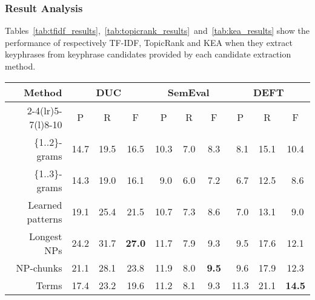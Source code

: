     \subsubsection{Result Analysis}
    \label{subsubsec:candidate_extraction_result_analysis}
      Tables~\ref{tab:tfidf_results},~\ref{tab:topicrank_results}~and~\ref{tab:kea_results}
      show the performance of respectively TF-IDF, TopicRank and KEA when
      they extract keyphrases from keyphrase candidates provided by each
      candidate extraction method.
      \begin{table*}
        \centering
        \begin{tabular}{@{~}rccccccccc@{~}}
          \toprule
          \multirow{2}{*}[-2pt]{\textbf{Method}} & \multicolumn{3}{c}{\textbf{DUC}} & \multicolumn{3}{c}{\textbf{SemEval}} & \multicolumn{3}{c}{\textbf{DEFT}}\\
          \cmidrule(r){2-4}\cmidrule(lr){5-7}\cmidrule(l){8-10}
          & P & R & F & P & R & F & P & R & F\\
          \midrule
          \{1..2\}-grams & 14.7 & 19.5 & 16.5 & 10.3 & $~~$7.0 & $~~$8.3 & $~~$8.1 & 15.1 & 10.4\\
          \{1..3\}-grams & 14.3 & 19.0 & 16.1 & $~~$9.0 & $~~$6.0 & $~~$7.2 & $~~$6.7 & 12.5 & $~~$8.6\\
          Learned patterns & 19.1 & 25.4 & 21.5 & 10.7 & $~~$7.3 & $~~$8.6 & $~~$7.0 & 13.1 & $~~$9.0\\
          Longest NPs & 24.2 & 31.7 & \textbf{27.0} & 11.7 & $~~$7.9 & $~~$9.3 & $~~$9.5 & 17.6 & 12.1\\
          NP-chunks & 21.1 & 28.1 & 23.8 & 11.9 & $~~$8.0 & \textbf{$~~$9.5} & $~~$9.6 & 17.9 & 12.3\\
          Terms & 17.4 & 23.2 & 19.6 & 11.2 & $~~$8.1 & $~~$9.3 & 11.3 & 21.1 & \textbf{14.5}\\
          \bottomrule
        \end{tabular}
        \caption{Comparison of candidate extraction methods, when extracting 10
                 keyphrases with \textbf{TF-IDF}.
                 \label{tab:tfidf_results}}
      \end{table*}
